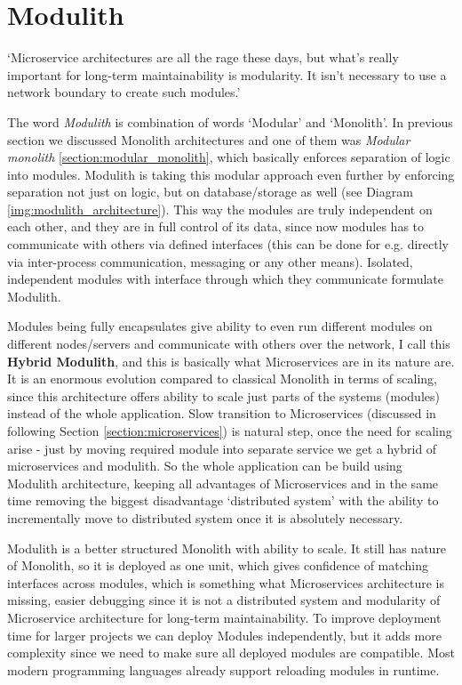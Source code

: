 \section{Modulith}
\label{section:modulith}
`Microservice architectures are all the rage these days, but what's really important for long-term maintainability is modularity. It isn't necessary to use a network boundary to create such modules.' \cite{HOW_TO_BUILD_MODULAR_MONOLITH_CONFERENCE_INTRO}

The word \textit{Modulith} is combination of words `Modular' and `Monolith'. In previous section we discussed Monolith architectures and one of them was \textit{Modular monolith} \ref{section:modular_monolith}, which basically enforces separation of logic into modules. Modulith is taking this modular approach even further by enforcing separation not just on logic, but on database/storage as well (see Diagram \ref{img:modulith_architecture}). This way the modules are truly independent on each other, and they are in full control of its data, since now modules has to communicate with others via defined interfaces (this can be done for e.g. directly via inter-process communication, messaging or any other means). Isolated, independent modules with interface through which they communicate formulate Modulith.

Modules being fully encapsulates give ability to even run different modules on different nodes/servers and communicate with others over the network, I call this \textbf{Hybrid Modulith}, and this is basically what Microservices are in its nature are. It is an enormous evolution compared to classical Monolith in terms of scaling, since this architecture offers ability to scale just parts of the systems (modules) instead of the whole application. Slow transition to Microservices (discussed in following Section \ref{section:microservices}) is natural step, once the need for scaling arise - just by moving required module into separate service we get a hybrid of microservices and modulith. So the whole application can be build using Modulith architecture, keeping all advantages of Microservices and in the same time removing the biggest disadvantage `distributed system' with the ability to incrementally move to distributed system once it is absolutely necessary.

Modulith is a better structured Monolith with ability to scale. It still has nature of Monolith, so it is deployed as one unit, which gives confidence of matching interfaces across modules, which is something what Microservices architecture is missing, easier debugging since it is not a distributed system and modularity of Microservice architecture for long-term maintainability. To improve deployment time for larger projects we can deploy Modules independently, but it adds more complexity since we need to make sure all deployed modules are compatible. Most modern programming languages already support reloading modules in runtime.

